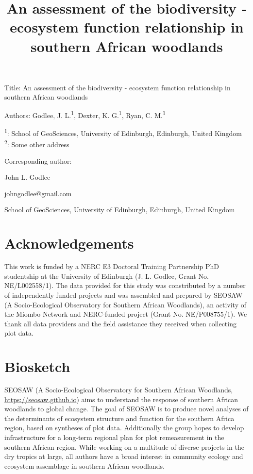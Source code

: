 \documentclass[11pt,a4paper]{article}
\title{An assessment of the biodiversity - ecosystem function relationship in southern African woodlands}
\author{}
\date{}
\begin{document}
{\LARGE{Title: An assessment of the biodiversity - ecosystem function relationship in southern African woodlands}}

\vspace{1cm}

Authors: Godlee, J. L.\textsuperscript{1}, Dexter, K. G.\textsuperscript{1}, Ryan, C. M.\textsuperscript{1}

\textsuperscript{1}: School of GeoSciences, University of Edinburgh, Edinburgh, United Kingdom \\
\textsuperscript{2}: Some other address

\vspace{1em}
Corresponding author:

John L. Godlee

johngodlee@gmail.com

School of GeoSciences, University of Edinburgh, Edinburgh, United Kingdom


\section*{Acknowledgements}

This work is funded by a NERC E3 Doctoral Training Partnership PhD studentship at the University of Edinburgh (J. L. Godlee, Grant No. NE/L002558/1). The data provided for this study was constributed by a number of independently funded projects and was assembled and prepared by SEOSAW (A Socio-Ecological Observatory for Southern African Woodlands), an activity of the Miombo Network and NERC-funded project (Grant No. NE/P008755/1). We thank all data providers and the field assistance they received when collecting plot data. 

\section*{Biosketch}

SEOSAW (A Socio-Ecological Observatory for Southern African Woodlands, \url{https://seosaw.github.io}) aims to understand the response of southern African woodlands to global change. The goal of SEOSAW is to produce novel analyses of the determinants of ecosystem structure and function for the southern Africa region, based on syntheses of plot data. Additionally the group hopes to develop infrastructure for a long-term regional plan for plot remeasurement in the southern African region. While working on a multitude of diverse projects in the dry tropics at large, all authors have a broad interest in community ecology and ecosystem assemblage in southern African woodlands.
\end{document}
